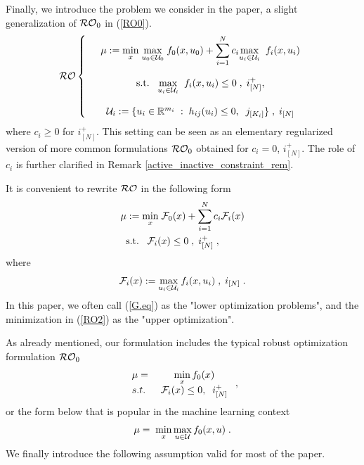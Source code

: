 \documentclass[journal,twoside,web]{ieeecolor}
\begin{document}
Finally, we introduce the problem we consider in the paper, a slight generalization of ${\cal RO}_0$ in (\ref{RO0}).
\begin{equation}{\cal RO}\left\{\begin{array}{ccc}
&\mu:=\underset{x}{\min} \;\underset{u_0\in {\cal U}_0}{\max}\; f_0(x,u_0)+\displaystyle\sum_{i=1}^N c_i \underset{u_i\in {\cal U}_i}{\max}\;\; f_i(x,u_i)\label{RO}\\ \\
&\text{s.t.}\;\;\;\underset{u_i\in {\cal U}_i}{\max}\;\; f_i(x,u_i)\leq 0\;,\;i^+_{[N]},\\ \\
&{\cal U}_i:=\{u_ i\in \mathbb{R}^{m_i}\;:\;h_{ij}(u_i)\leq 0,\;\;j_{[K_i]}\}\;,\;i_{[N]}
\end{array}\right.
\end{equation}
where $c_i\geq 0$ for $i^+_{[N]}$. This setting can be seen as an elementary regularized version of more common formulations ${\cal RO}_0$ obtained for $c_i=0$, $i_{[N]}^+$.
The role of $c_i$ is further clarified in Remark \ref{active_inactive_constraint_rem}.

It is convenient to rewrite ${\cal RO}$ in the following form
\begin{align}
&\mu:=\underset{x}{\min} \; {\cal F}_0(x)+\sum_{i=1}^N c_i{\cal F}_i(x)\label{RO2}\\
&\;\;\text{s.t.}\;\;\;{\cal F}_i(x)\leq 0\;,\;i^+_{[N]}\;,\nonumber
\end{align}
where
\begin{equation}\label{G.eq}
{\cal F}_i(x):=\max_{u_i\in {\cal U}_i} f_i(x,u_i)\;,\; i_{[N]}\;.
\end{equation}
In this paper, we often call (\ref{G.eq}) as the "lower optimization problems", and the minimization in (\ref{RO2}) as the "upper optimization".

 As already mentioned, our formulation includes the typical robust optimization formulation ${\cal RO}_0$
\begin{equation}
\begin{array}{lcc}
\mu=&\;\displaystyle\min_x f_0(x)\\
s.t.&\; {\cal F}_i(x)\leq 0,\;\;i^+_{[N]}
\end{array}\;,
\label{RO3}
\end{equation}
or the form below that is popular in the machine learning context \cite{rafique2022,zhang2021}
\begin{equation}
\mu=\;\displaystyle\min_x\max_{u\in {\cal U}} f_0(x,u)\;.
\end{equation}
We finally introduce the following assumption valid for most of the paper.
\end{document}
